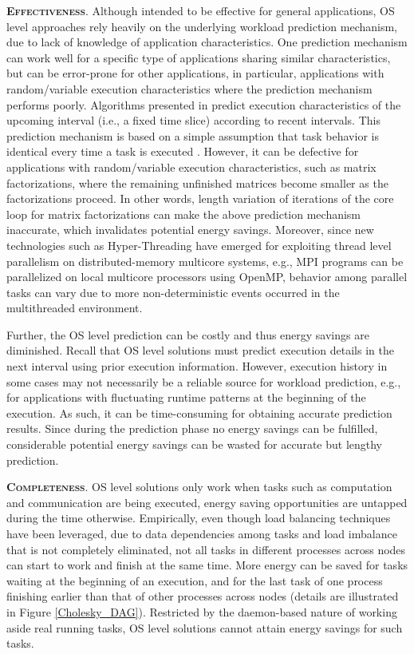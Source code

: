 \documentclass[12pt]{elsarticle}
\begin{document}
\vspace{1mm}
\noindent\textsc{\textbf{Effectiveness}}. Although intended to be effective for general applications, OS level approaches rely heavily on the underlying workload prediction mechanism, due to lack of knowledge of application characteristics. One prediction mechanism can work well for a specific type of applications sharing similar characteristics, but can be error-prone for other applications, in particular, applications with random/variable execution characteristics where the prediction mechanism performs poorly. Algorithms presented in \cite{sc06} \cite{sc07} \cite{ics09} predict execution characteristics of the upcoming interval (i.e., a fixed time slice) according to recent intervals. This prediction mechanism is based on a simple assumption that task behavior is identical every time a task is executed \cite{ics09}. However, it can be defective for applications with random/variable execution characteristics, such as matrix factorizations, where the remaining unfinished matrices become smaller as the factorizations proceed. In other words, length variation of iterations of the core loop for matrix factorizations can make the above prediction mechanism inaccurate, which invalidates potential energy savings. Moreover, since new technologies such as Hyper-Threading \cite{ht} have emerged for exploiting thread level parallelism on distributed-memory multicore systems, e.g., MPI programs can be parallelized on local multicore processors using OpenMP, behavior among parallel tasks can vary due to more non-deterministic events occurred in the multithreaded environment.

Further, the OS level prediction can be costly and thus energy savings are diminished. Recall that OS level solutions must predict execution details in the next interval using prior execution information. However, execution history in some cases may not necessarily be a reliable source for workload prediction, e.g., for applications with fluctuating runtime patterns at the beginning of the execution. As such, it can be time-consuming for obtaining accurate prediction results. Since during the prediction phase no energy savings can be fulfilled, considerable potential energy savings can be wasted for accurate but lengthy prediction.

\vspace{1mm}
\noindent\textsc{\textbf{Completeness}}. OS level solutions only work when tasks such as computation and communication are being executed, energy saving opportunities are untapped during the time otherwise. Empirically, even though load balancing techniques have been leveraged, due to data dependencies among tasks and load imbalance that is not completely eliminated, not all tasks in different processes across nodes can start to work and finish at the same time. More energy can be saved for tasks waiting at the beginning of an execution, and for the last task of one process finishing earlier than that of other processes across nodes (details are illustrated in Figure \ref{Cholesky_DAG}). Restricted by the daemon-based nature of working aside real running tasks, OS level solutions cannot attain energy savings for such tasks.
\end{document}
